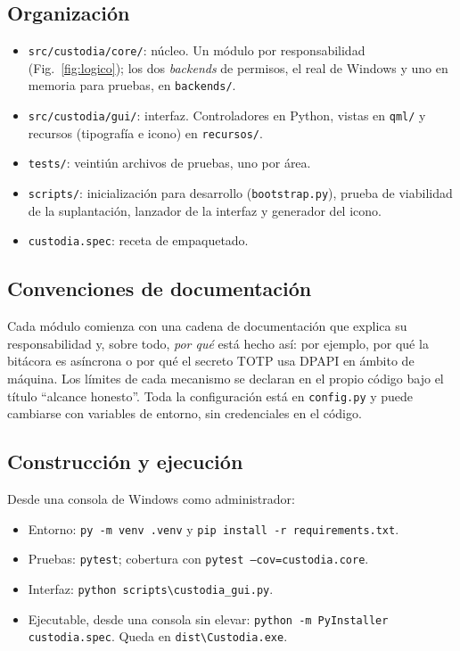\documentclass[conference]{IEEEtran}
\begin{document}
\subsection{Organización}
\begin{itemize}
    \item \texttt{src/custodia/core/}: núcleo. Un módulo por responsabilidad (Fig.~\ref{fig:logico}); los dos \textit{backends} de permisos, el real de Windows y uno en memoria para pruebas, en \texttt{backends/}.
    \item \texttt{src/custodia/gui/}: interfaz. Controladores en Python, vistas en \texttt{qml/} y recursos (tipografía e icono) en \texttt{recursos/}.
    \item \texttt{tests/}: veintiún archivos de pruebas, uno por área.
    \item \texttt{scripts/}: inicialización para desarrollo (\texttt{bootstrap.py}), prueba de viabilidad de la suplantación, lanzador de la interfaz y generador del icono.
    \item \texttt{custodia.spec}: receta de empaquetado.
\end{itemize}

\subsection{Convenciones de documentación}
Cada módulo comienza con una cadena de documentación que explica su responsabilidad y, sobre todo, \textit{por qué} está hecho así: por ejemplo, por qué la bitácora es asíncrona o por qué el secreto TOTP usa DPAPI en ámbito de máquina. Los límites de cada mecanismo se declaran en el propio código bajo el título ``alcance honesto''. Toda la configuración está en \texttt{config.py} y puede cambiarse con variables de entorno, sin credenciales en el código.

\subsection{Construcción y ejecución}
Desde una consola de Windows como administrador:
\begin{itemize}
    \item Entorno: \texttt{py -m venv .venv} y \texttt{pip install -r requirements.txt}.
    \item Pruebas: \texttt{pytest}; cobertura con \texttt{pytest --cov=custodia.core}.
    \item Interfaz: \texttt{python scripts\textbackslash custodia\_gui.py}.
    \item Ejecutable, desde una consola sin elevar: \texttt{python -m PyInstaller custodia.spec}. Queda en \texttt{dist\textbackslash Custodia.exe}.
\end{itemize}
\end{document}
